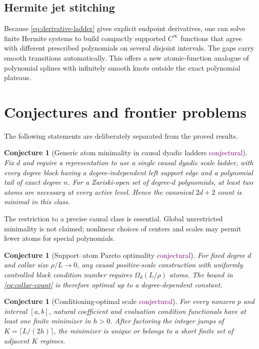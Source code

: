 \documentclass[11pt]{article}
\newtheorem{conjecture}[theorem]{Conjecture}
\theoremstyle{definition}
\theoremstyle{remark}
\newcommand{\1}{\mathbf{1}}
\newcommand{\Conjectural}{\textcolor{Purple}{\textsf{conjectural}}}
\begin{document}
\subsection{Hermite jet stitching}

Because \eqref{eq:derivative-ladder} gives explicit endpoint derivatives, one
can solve finite Hermite systems to build compactly supported $C^\infty$
functions that agree with different prescribed polynomials on several disjoint
intervals.  The gaps carry smooth transitions automatically.  This offers a
new atomic-function analogue of polynomial splines with infinitely smooth
knots outside the exact polynomial plateaus.

\section{Conjectures and frontier problems}

The following statements are deliberately separated from the proved results.

\begin{conjecture}[Generic atom minimality in causal dyadic ladders
\Conjectural]
Fix $d$ and require a representation to use a single causal dyadic scale ladder,
with every degree block having a degree-independent left support edge and a
polynomial tail of exact degree $n$.  For a Zariski-open set of degree-$d$
polynomials, at least two atoms are necessary at every active level.  Hence the
canonical $2d+2$ count is minimal in this class.
\end{conjecture}

The restriction to a precise causal class is essential.  Global unrestricted
minimality is not claimed; nonlinear choices of centers and scales may permit
fewer atoms for special polynomials.

\begin{conjecture}[Support--atom Pareto optimality \Conjectural]
For fixed degree $d$ and collar size $\rho/L\to0$, any causal positive-scale
construction with uniformly controlled block condition number requires
$\Omega_d(L/\rho)$ atoms.  The bound in \eqref{eq:collar-count} is therefore
optimal up to a degree-dependent constant.
\end{conjecture}

\begin{conjecture}[Conditioning-optimal scale \Conjectural]
For every nonzero $p$ and interval $[a,b]$, natural coefficient and evaluation
condition functionals have at least one finite minimizer in $h>0$.  After
factoring the integer jumps of $K=\lceil L/(2h)\rceil$, the minimizer is unique
or belongs to a short finite set of adjacent $K$ regimes.
\end{conjecture}
\end{document}

